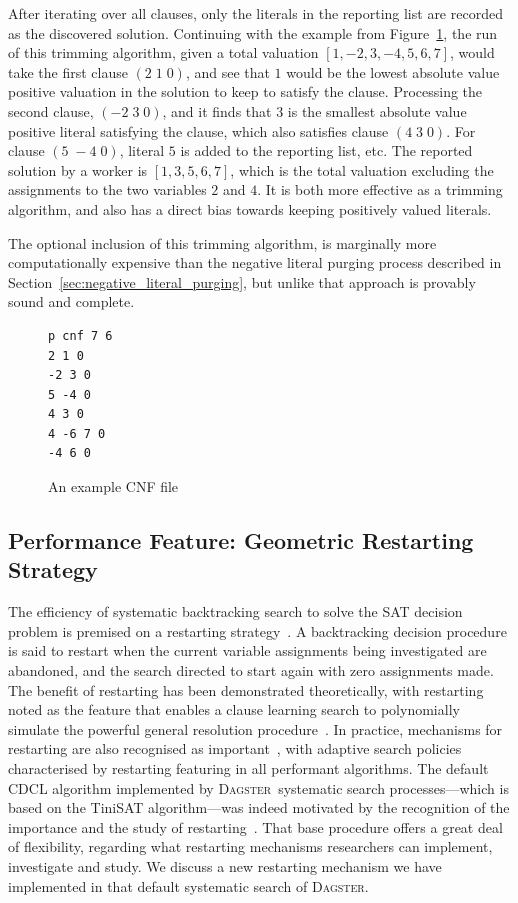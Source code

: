 \documentclass[10pt,a4paper,oneside,headinclude,footinclude,BCOR5mm]{scrartcl}
\newcommand{\dagster}{\textsc{Dagster}\xspace}
\begin{document}
After iterating over all clauses, only the literals in the reporting list are recorded as the discovered solution.
Continuing with the example from Figure~\ref{fig:example_cnf}, the run of this trimming algorithm,  given a total valuation $[1,-2,3,-4,5,6,7]$, would take the first clause $(2\; 1\; 0)$, and see that $1$ would be the lowest absolute value positive valuation in the solution to keep to satisfy the clause.
Processing the second clause, $(-2\; 3\; 0)$, and it finds that  $3$ is the smallest absolute value positive literal satisfying the clause, which also satisfies clause $(4\; 3\; 0)$.
For clause $(5\; -4\; 0)$, literal $5$ is added to the reporting list, etc.
The reported solution by a worker is $[1,3,5,6,7]$, which is the total valuation excluding the assignments to the two variables $2$ and $4$.
It is both more effective as a trimming algorithm, and also has a direct bias towards keeping positively valued literals.

The optional inclusion of this trimming algorithm, is marginally more computationally expensive than the negative literal purging process described in Section~\ref{sec:negative_literal_purging}, but unlike that approach is provably sound and complete.


\begin{figure}
\begin{Verbatim}[frame=single, label=CNF file]
p cnf 7 6
2 1 0
-2 3 0
5 -4 0
4 3 0
4 -6 7 0
-4 6 0
\end{Verbatim}
\caption{An example CNF file}\label{fig:example_cnf}
\end{figure}

\subsection{Performance Feature: Geometric Restarting Strategy}\label{sec:dynamic_restarting}

The efficiency of systematic backtracking search to solve the SAT decision problem is premised on a restarting strategy~\cite{marques2021conflict}.
A backtracking decision procedure is said to restart when the current variable assignments being investigated are abandoned, and the search directed to start again with zero assignments made.
The benefit of restarting has been demonstrated theoretically, with restarting noted as the feature that enables a clause learning search to polynomially simulate the powerful general resolution procedure~\cite{pipatsrisawat:darwiche:2011,hertel:etal:2008,buss2021proof}.
In practice, mechanisms for restarting are also recognised as important~\cite{gomes:etal:1998,armin:hans:2008,audemard2012refining,biere2015evaluating}, with adaptive search policies characterised by restarting featuring in all performant algorithms. 
The default CDCL algorithm implemented by \dagster\ systematic search processes---which is based on the {\textsc TiniSAT} algorithm---was indeed motivated by the recognition of the importance and the study of restarting~\cite{huang:2007}.
That base procedure offers a great deal of flexibility, regarding what restarting mechanisms researchers can implement, investigate and study.
We discuss a new restarting mechanism we have implemented in that default systematic search of \dagster.
\end{document}

